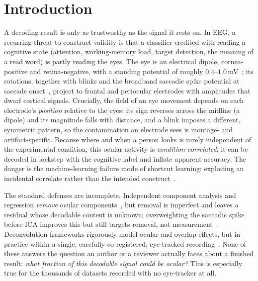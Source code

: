 \documentclass[conference]{IEEEtran}
\begin{document}
\section{Introduction}

A decoding result is only as trustworthy as the signal it rests on. In EEG, a recurring
threat to construct validity is that a classifier credited with reading a cognitive
state (attention, working-memory load, target detection, the meaning of a read
word) is partly reading the eyes. The eye is an electrical dipole, cornea-positive and
retina-negative, with a standing potential of roughly $0.4$--$1.0$\,mV~\cite{malmivuo1995bioelectromagnetism};
its rotations, together with blinks and the broadband saccadic spike potential at saccade
onset~\cite{keren2010saccadic}, project to frontal and periocular electrodes with amplitudes
that dwarf cortical signals. Crucially, the field of an eye movement
depends on each electrode's \emph{position} relative to the eyes: its sign reverses across the
midline (a dipole) and its magnitude falls with distance, and a blink imposes a different,
symmetric pattern, so the contamination an electrode sees is montage- and artifact-specific.
Because where and when a person looks is rarely independent of the experimental condition,
this ocular activity is \emph{condition-correlated}: it can be decoded in lockstep with the
cognitive label and inflate apparent accuracy. The danger is the machine-learning failure
mode of shortcut learning: exploiting an incidental correlate rather than the intended
construct~\cite{geirhos2020shortcut}.


The standard defenses are incomplete. Independent component analysis and regression
\emph{remove} ocular components~\cite{jung2000removing,plochl2012combining}, but removal is
imperfect and leaves a residual whose decodable content is unknown; overweighting the
saccadic spike before ICA improves this but still targets removal, not
measurement~\cite{dimigen2020optimizing,piontonachini2019iclabel}. Deconvolution frameworks
rigorously model ocular and overlap effects, but in practice within a single, carefully
co-registered, eye-tracked recording~\cite{ehinger2019unfold,dimigen2011coregistration}.
None of these answers the question an author or a reviewer actually faces about a finished
result: \emph{what fraction of this decodable signal could be ocular?} This is especially true for the
thousands of datasets recorded with no eye-tracker at all.
\end{document}
